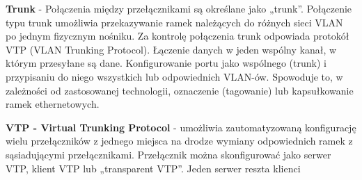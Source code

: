 \documentclass[../main.tex]{subfiles}
\begin{document}
    \textbf{Trunk} - Połączenia między przełącznikami są określane jako „trunk”.
    Połączenie typu trunk umożliwia przekazywanie ramek należących do różnych sieci VLAN
    po jednym fizycznym nośniku. Za kontrolę połączenia trunk odpowiada protokół VTP
    (VLAN Trunking Protocol). Łączenie danych w jeden wspólny kanał, w którym przesyłane
    są dane. Konfigurowanie portu jako wspólnego (trunk) i przypisaniu do niego wszystkich
    lub odpowiednich VLAN-ów. Spowoduje to, w zależności od zastosowanej technologii,
    oznaczenie (tagowanie) lub kapsułkowanie ramek ethernetowych.

    \textbf{VTP - Virtual Trunking Protocol} - umożliwia zautomatyzowaną konfigurację
    wielu przełączników z jednego miejsca na drodze wymiany odpowiednich ramek z
    sąsiadującymi przełącznikami. Przełącznik można skonfigurować jako serwer VTP,
    klient VTP lub „transparent VTP”. Jeden serwer reszta klienci
\end{document}

